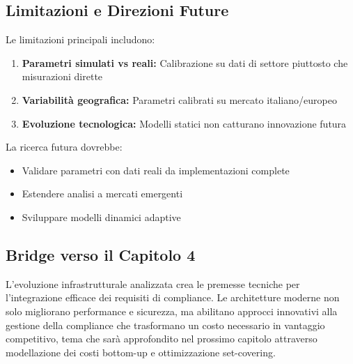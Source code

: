 \subsection{Limitazioni e Direzioni Future}

Le limitazioni principali includono:
\begin{enumerate}
\item \textbf{Parametri simulati vs reali:} Calibrazione su dati di settore piuttosto che misurazioni dirette
\item \textbf{Variabilità geografica:} Parametri calibrati su mercato italiano/europeo
\item \textbf{Evoluzione tecnologica:} Modelli statici non catturano innovazione futura
\end{enumerate}

La ricerca futura dovrebbe:
\begin{itemize}
\item Validare parametri con dati reali da implementazioni complete
\item Estendere analisi a mercati emergenti
\item Sviluppare modelli dinamici adaptive
\end{itemize}

\subsection{Bridge verso il Capitolo 4}

L'evoluzione infrastrutturale analizzata crea le premesse tecniche per l'integrazione efficace dei requisiti di compliance. Le architetture moderne non solo migliorano performance e sicurezza, ma abilitano approcci innovativi alla gestione della compliance che trasformano un costo necessario in vantaggio competitivo, tema che sarà approfondito nel prossimo capitolo attraverso modellazione dei costi bottom-up e ottimizzazione set-covering.
